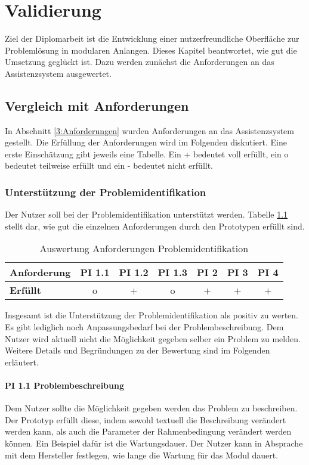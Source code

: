 \chapter{Validierung}
\label{Validierung}

Ziel der Diplomarbeit ist die Entwicklung einer nutzerfreundliche Oberfläche zur Problemlösung in modularen Anlangen. Dieses Kapitel beantwortet, wie gut die Umsetzung geglückt ist. Dazu werden zunächst die Anforderungen an das Assistenzsystem ausgewertet. 

\section{Vergleich mit Anforderungen}
In Abschnitt \ref{3:Anforderungen} wurden Anforderungen an das Assistenzsystem gestellt. Die Erfüllung der Anforderungen wird im Folgenden diskutiert. Eine erste Einschätzung gibt jeweils eine Tabelle. Ein + bedeutet voll erfüllt, ein o bedeutet teilweise erfüllt und ein - bedeutet nicht erfüllt.

\subsection{Unterstützung der Problemidentifikation}
Der Nutzer soll bei der Problemidentifikation unterstützt werden. Tabelle \ref{tab:Anforderungen-Problemidentifikation} stellt dar, wie gut die einzelnen Anforderungen durch den Prototypen erfüllt sind.
\begin{table}[htbp]
\caption{Auswertung Anforderungen Problemidentifikation}
\centering
\begin{tabular}{l|c|c|c|c|c|c}
\textbf{Anforderung} & PI 1.1 & PI 1.2 & PI 1.3 & PI 2 & PI 3 & PI 4 \\
\hline
\textbf{Erfüllt} & o & + & o & + & + & + \\
\end{tabular}
\label{tab:Anforderungen-Problemidentifikation}
\end{table}

Insgesamt ist die Unterstützung der Problemidentifikation als positiv zu werten. Es gibt lediglich noch Anpassungsbedarf bei der Problembeschreibung. Dem Nutzer wird aktuell nicht die Möglichkeit gegeben selber ein Problem zu melden. Weitere Details und Begründungen zu der Bewertung sind im Folgenden erläutert.

\subsubsection*{PI 1.1 Problembeschreibung}
Dem Nutzer sollte die Möglichkeit gegeben werden das Problem zu beschreiben. Der Prototyp erfüllt diese, indem sowohl textuell die Beschreibung verändert werden kann, als auch die Parameter der Rahmenbedingung verändert werden können. Ein Beispiel dafür ist die Wartungsdauer. Der Nutzer kann in Absprache mit dem Hersteller festlegen, wie lange die Wartung für das Modul dauert.

